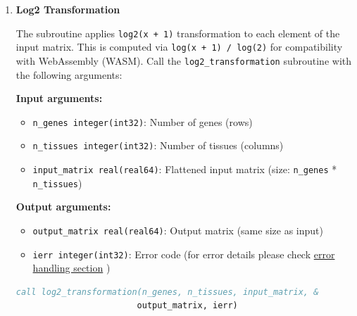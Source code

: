 \begin{enumerate}
\begin{enumerate}
\begin{itemize}
                    \item \texttt{ierr integer(int32)}: Error code (for error details
                          please check \hyperref[sec:error-handling]{error handling section}
                          )
                  \end{itemize}
                  \begin{lstlisting}[language=Fortran, caption={Tissue Averages Calculation}]
call calc_tiss_avg(n_gene, n_grps, group_s, group_c, input_matrix, &
                    output_matrix, ierr)
                  \end{lstlisting}
                  
            \item \textbf{Log2 Transformation}
                  
                  The subroutine applies \texttt{log2(x + 1)} transformation to each
                  element of the input matrix. This is computed via \texttt{log(x + 1) /
                    log(2)} for compatibility with WebAssembly (WASM). Call the \texttt{log2\_transformation}
                  subroutine with the following arguments:
                  
                  \textbf{Input arguments:}
                  \begin{itemize}
                    \item \texttt{n\_genes integer(int32)}: Number of genes (rows)
                          
                    \item \texttt{n\_tissues integer(int32)}: Number of tissues (columns)
                          
                    \item \texttt{input\_matrix real(real64)}: Flattened input matrix (size:
                          \texttt{n\_genes} * \texttt{n\_tissues})
                  \end{itemize}
                  \textbf{Output arguments:}
                  \begin{itemize}
                    \item \texttt{output\_matrix real(real64)}: Output matrix (same size
                          as input)
                          
                    \item \texttt{ierr integer(int32)}: Error code (for error details
                          please check \hyperref[sec:error-handling]{error handling section}
                          )
                  \end{itemize}
                  \begin{lstlisting}[language=Fortran, caption={Log2 Transformation}]
call log2_transformation(n_genes, n_tissues, input_matrix, &
                        output_matrix, ierr)
                  \end{lstlisting}
          \end{enumerate}
          

\end{enumerate}
